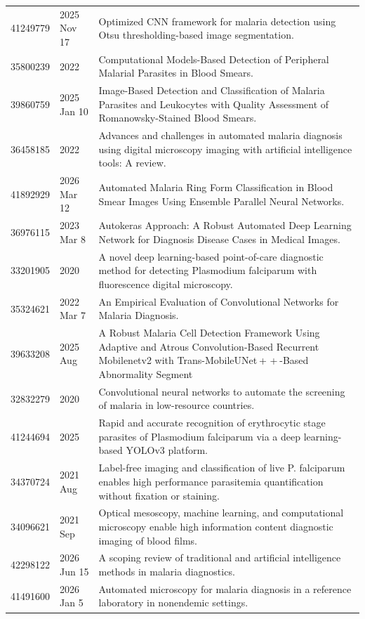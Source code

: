 \begin{longtable}{llp{9.5cm}}
41249779 & 2025 Nov 17 & Optimized CNN framework for malaria detection using Otsu thresholding-based image segmentation. \\
35800239 & 2022 & Computational Models-Based Detection of Peripheral Malarial Parasites in Blood Smears. \\
39860759 & 2025 Jan 10 & Image-Based Detection and Classification of Malaria Parasites and Leukocytes with Quality Assessment of Romanowsky-Stained Blood Smears. \\
36458185 & 2022 & Advances and challenges in automated malaria diagnosis using digital microscopy imaging with artificial intelligence tools: A review. \\
41892929 & 2026 Mar 12 & Automated Malaria Ring Form Classification in Blood Smear Images Using Ensemble Parallel Neural Networks. \\
36976115 & 2023 Mar 8 & Autokeras Approach: A Robust Automated Deep Learning Network for Diagnosis Disease Cases in Medical Images. \\
33201905 & 2020 & A novel deep learning-based point-of-care diagnostic method for detecting Plasmodium falciparum with fluorescence digital microscopy. \\
35324621 & 2022 Mar 7 & An Empirical Evaluation of Convolutional Networks for Malaria Diagnosis. \\
39633208 & 2025 Aug & A Robust Malaria Cell Detection Framework Using Adaptive and Atrous Convolution-Based Recurrent Mobilenetv2 with Trans-MobileUNet + + -Based Abnormality Segment \\
32832279 & 2020 & Convolutional neural networks to automate the screening of malaria in low-resource countries. \\
41244694 & 2025 & Rapid and accurate recognition of erythrocytic stage parasites of Plasmodium falciparum via a deep learning-based YOLOv3 platform. \\
34370724 & 2021 Aug & Label-free imaging and classification of live P. falciparum enables high performance parasitemia quantification without fixation or staining. \\
34096621 & 2021 Sep & Optical mesoscopy, machine learning, and computational microscopy enable high information content diagnostic imaging of blood films. \\
42298122 & 2026 Jun 15 & A scoping review of traditional and artificial intelligence methods in malaria diagnostics. \\
41491600 & 2026 Jan 5 & Automated microscopy for malaria diagnosis in a reference laboratory in nonendemic settings. \\

\end{longtable}
